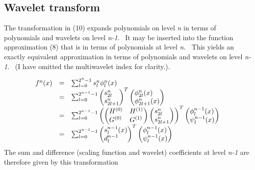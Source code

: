 \documentclass[letterpaper]{article}
\begin{document}
\bigskip


\bigskip

\subsection{Wavelet transform}
The transformation in (10) expands polynomials on level \textit{n }in terms of polynomials and wavelets on level
\textit{n-1}. \ It may be inserted into the function approximation (8) that is in terms of polynomials at level
\textit{n. \ }This yields an exactly equivalent approximation in terms of polynomials and wavelets on level
\textit{n-1}. \ (I have omitted the multiwavelet index for clarity.).

\begin{equation}
\begin{matrix}f^{n}(x)&\text{=}&\sum _{l=0}^{2^{n}-1}{s_{l}^{n}\phi _{l}^{n}(x)}\hfill\null \\\text{}&\text{=}&\sum
_{l=0}^{2^{n-1}-1}{\left(\begin{matrix}s_{2l}^{n}\hfill\null \\s_{2l+1}^{n}\hfill\null
\end{matrix}\right)^{T}\left(\begin{matrix}\phi _{2l}^{n}(x)\hfill\null \\\phi _{2l+1}^{n}(x)\hfill\null
\end{matrix}\right)}\hfill\null \\\text{}&\text{=}&\sum _{l=0}^{2^{n-1}-1}{\left(\left(\begin{matrix}H^{(0)}\hfill\null
&H^{(1)}\hfill\null \\G^{(0)}\hfill\null &G^{(1)}\hfill\null
\end{matrix}\right)\left(\begin{matrix}s_{2l}^{n}\hfill\null \\s_{2l+1}^{n}\hfill\null
\end{matrix}\right)\right)^{T}\left(\begin{matrix}\phi _{l}^{n-1}(x)\hfill\null \\\psi _{l}^{n-1}(x)\hfill\null
\end{matrix}\right)}\hfill\null \\\text{}&\text{=}&\sum
_{l=0}^{2^{n-1}-1}{\left(\begin{matrix}s_{l}^{n-1}(x)\hfill\null \\d_{l}^{n-1}\hfill\null
\end{matrix}\right)^{T}\left(\begin{matrix}\phi _{l}^{n-1}(x)\hfill\null \\\psi _{l}^{n-1}(x)\hfill\null
\end{matrix}\right)}\hfill\null \end{matrix}
\end{equation}
The sum and difference (scaling function and wavelet) coefficients at level \textit{n-1} are therefore given by this
transformation
\end{document}
